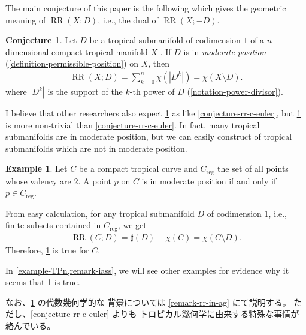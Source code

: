 \documentclass[a4paper,dvipdfmx,reqno,12pt]{amsart}
\theoremstyle{definition}
\newtheorem{example}[theorem]{Example}
\newtheorem{conjecture}[theorem]{Conjecture}
\newcommand{\opn}[1]{\operatorname{#1}}
\numberwithin{equation}{section}
\begin{document}
The main conjecture of this paper is the following 
which gives
the geometric meaning of $\opn{RR}(X;D)$, i.e.,
the dual of $\opn{RR}(X;-D)$.

\begin{conjecture}
\label{conjecture-rr-euler}
Let $D$ be a tropical submanifold of codimension 
$1$ of a $n$-dimensional compact tropical manifold $X$
\cite[Definition 2.14]{demedrano2023chern}.
If $D$ is in \emph{moderate position}
(\cref{definition-permissible-position}) on $X$,
then 
\begin{align}
\opn{RR}(X;D)=\sum_{k=0}^{n}\chi(|D^k|)=\chi(X\setminus D).
\end{align}
where $|D^{k}|$ is the support of the $k$-th power
of $D$ (\cref{notation-power-divisor}). 
\end{conjecture}
I believe that other researchers also expect
\cref{conjecture-rr-euler} as like
\cref{conjecture-rr-c-euler},
but \cref{conjecture-rr-euler} is more non-trivial than
\cref{conjecture-rr-c-euler}.
In fact, many tropical submanifolds are in moderate position,
but we can easily construct of tropical submanifolds
which are not in moderate position.

\begin{example}
\label{example-permissible-point}
Let $C$ be a compact tropical curve 
and $C_{\mathrm{reg}}$ the set of all
points whose valency are $2$.
A point $p$ on $C$ is in moderate position
if and only if $p\in C_{\mathrm{reg}}$.

From easy calculation, for any 
tropical submanifold $D$ of codimension $1$, i.e.,
finite subsets contained in $C_{\mathrm{reg}}$, we get
\begin{align}
\opn{RR}(C;D)=\sharp (D)+ \chi(C)
=\chi(C\setminus D).
\end{align}
Therefore, \cref{conjecture-rr-euler} is true
for $C$.
\end{example}
In \cref{example-TPn,remark-iass},
we will see other examples for evidence 
why it seems that \cref{conjecture-rr-euler}
is true.

なお、\cref{conjecture-rr-euler} の代数幾何学的な
背景については \cref{remark-rr-in-ag} にて説明する。
ただし、\cref{conjecture-rr-c-euler} よりも
トロピカル幾何学に由来する特殊な事情が絡んでいる。
\end{document}
